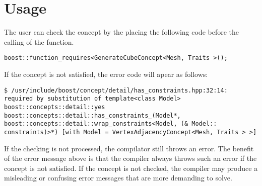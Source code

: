 \section{Usage}

The user can check the concept by the placing the following code before the calling of the function.
\begin{lstlisting}
boost::function_requires<GenerateCubeConcept<Mesh, Traits >();
\end{lstlisting}
If the concept is not satisfied, the error code will apear as follows:


\begin{lstlisting}
$ /usr/include/boost/concept/detail/has_constraints.hpp:32:14:   required by substitution of template<class Model> boost::concepts::detail::yes boost::concepts::detail::has_constraints_(Model*, boost::concepts::detail::wrap_constraints<Model, (& Model:: constraints)>*) [with Model = VertexAdjacencyConcept<Mesh, Traits > >]
\end{lstlisting}
If the checking is not processed, the compilator still throws an error. The benefit of the error
message above is that the compiler always throws such an error if the concept is not satisfied.
If the concept is not checked, the compiler may produce a misleading or confusing error messages
that are more demanding to solve.

